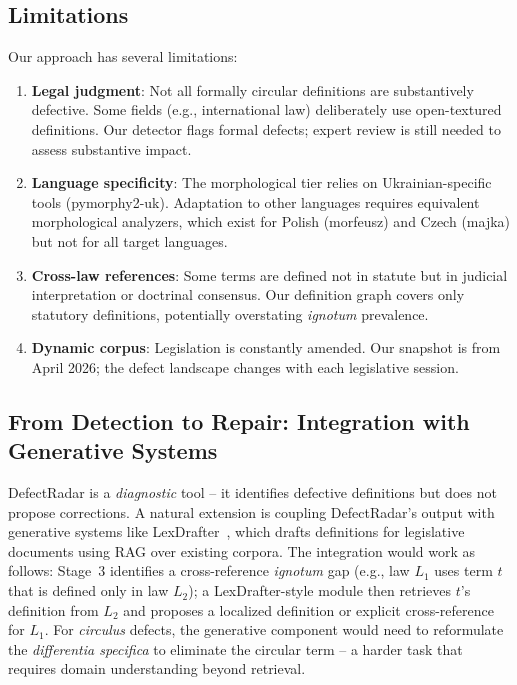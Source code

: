 \documentclass[11pt]{article}
\begin{document}
\subsection{Limitations}

Our approach has several limitations:

\begin{enumerate}[nosep,leftmargin=*]
  \item \textbf{Legal judgment}: Not all formally circular definitions are substantively defective. Some fields (e.g., international law) deliberately use open-textured definitions. Our detector flags formal defects; expert review is still needed to assess substantive impact.
  \item \textbf{Language specificity}: The morphological tier relies on Ukrainian-specific tools (pymorphy2-uk). Adaptation to other languages requires equivalent morphological analyzers, which exist for Polish (morfeusz) and Czech (majka) but not for all target languages.
  \item \textbf{Cross-law references}: Some terms are defined not in statute but in judicial interpretation or doctrinal consensus. Our definition graph covers only statutory definitions, potentially overstating \emph{ignotum} prevalence.
  \item \textbf{Dynamic corpus}: Legislation is constantly amended. Our snapshot is from April 2026; the defect landscape changes with each legislative session.
\end{enumerate}

\subsection{From Detection to Repair: Integration with Generative Systems}

DefectRadar is a \emph{diagnostic} tool -- it identifies defective definitions but does not propose corrections.
A natural extension is coupling DefectRadar's output with generative systems like LexDrafter~\citep{chouhan2024lexdrafter}, which drafts definitions for legislative documents using RAG over existing corpora.
The integration would work as follows: Stage~3 identifies a cross-reference \emph{ignotum} gap (e.g., law $L_1$ uses term $t$ that is defined only in law $L_2$); a LexDrafter-style module then retrieves $t$'s definition from $L_2$ and proposes a localized definition or explicit cross-reference for $L_1$.
For \emph{circulus} defects, the generative component would need to reformulate the \emph{differentia specifica} to eliminate the circular term -- a harder task that requires domain understanding beyond retrieval.
\end{document}
